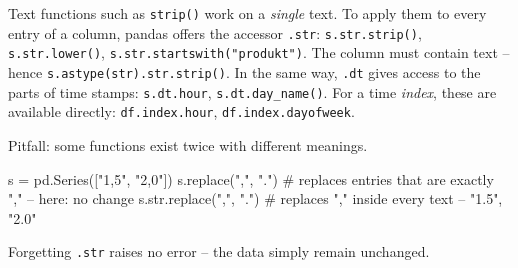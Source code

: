\documentclass[
  letterpaper,
  DIV=11,
  numbers=noendperiod]{scrreprt}
\newenvironment{Shaded}{\begin{snugshade}}{\end{snugshade}}
\newcommand{\BuiltInTok}[1]{\textcolor[rgb]{0.00,0.23,0.31}{#1}}
\newcommand{\CommentTok}[1]{\textcolor[rgb]{0.37,0.37,0.37}{#1}}
\newcommand{\NormalTok}[1]{\textcolor[rgb]{0.00,0.23,0.31}{#1}}
\newcommand{\OperatorTok}[1]{\textcolor[rgb]{0.37,0.37,0.37}{#1}}
\newcommand{\StringTok}[1]{\textcolor[rgb]{0.13,0.47,0.30}{#1}}
\begin{document}
\begin{tcolorbox}[enhanced jigsaw, left=2mm, title=\textcolor{quarto-callout-tip-color}{\faLightbulb}\hspace{0.5em}{\texttt{.str} and \texttt{.dt}: functions for every entry of a column}, opacityback=0, breakable, rightrule=.15mm, arc=.35mm, toptitle=1mm, colbacktitle=quarto-callout-tip-color!10!white, opacitybacktitle=0.6, coltitle=black, colframe=quarto-callout-tip-color-frame, bottomrule=.15mm, leftrule=.75mm, bottomtitle=1mm, titlerule=0mm, toprule=.15mm, colback=white]

Text functions such as \texttt{strip()} work on a \emph{single} text. To
apply them to every entry of a column, pandas offers the accessor
\texttt{.str}: \texttt{s.str.strip()}, \texttt{s.str.lower()},
\texttt{s.str.startswith("produkt")}. The column must contain text --
hence \texttt{s.astype(str).str.strip()}. In the same way, \texttt{.dt}
gives access to the parts of time stamps: \texttt{s.dt.hour},
\texttt{s.dt.day\_name()}. For a time \emph{index}, these are available
directly: \texttt{df.index.hour}, \texttt{df.index.dayofweek}.

Pitfall: some functions exist twice with different meanings.

\begin{Shaded}
\begin{Highlighting}[]
\NormalTok{s }\OperatorTok{=}\NormalTok{ pd.Series([}\StringTok{"1,5"}\NormalTok{, }\StringTok{"2,0"}\NormalTok{])}
\NormalTok{s.replace(}\StringTok{","}\NormalTok{, }\StringTok{"."}\NormalTok{)        }\CommentTok{\# replaces entries that are exactly "," – here: no change}
\NormalTok{s.}\BuiltInTok{str}\NormalTok{.replace(}\StringTok{","}\NormalTok{, }\StringTok{"."}\NormalTok{)    }\CommentTok{\# replaces "," inside every text – "1.5", "2.0"}
\end{Highlighting}
\end{Shaded}

Forgetting \texttt{.str} raises no error -- the data simply remain
unchanged.

\end{tcolorbox}
\end{document}
